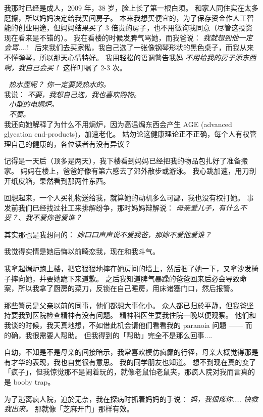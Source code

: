 \documentclass[12pt]{report}
\newcommand{\tab}{\hspace*{1cm}}
\newcommand{\speechCn}[1]{\textrm{\textit{\textcolor{Speech}{#1}}}}
\newcommand*\dashh{\,\,\textemdash\kern-1pt\textemdash\,\,}
\begin{document}
我那时已经是成人，2009 年，38 岁，脸上长了第一根白须。 和家人同住实在太多磨擦，所以妈妈决定给我买间房子。 本来我想买便宜的，为了保存资金作人工智能的创业用途，但妈妈结果买了 3 倍贵的房子，也不用徵询我同意（尽管这投资现在看来是不错的）。 我在看楼的时候发脾气骂她，而我爸说： \speechCn{我就想到他一定会骂....}! \  后来我们去买家俬，我自己选了一张像钢琴形状的黑色桌子，而我从来不懂弹琴，所以那天心情特好。 我用轻松的语调警告我妈 \speechCn{不用给我的房子添东西啊，我自己会买！}  这样叮嘱了 2-3 次。

\tab \dashh \speechCn{热水壶呢？ 你一定要煲热水的。}\\
\tab 我说： \speechCn{不要，我想自己选，我也喜欢购物。} \\
\tab \dashh \speechCn{小型的电焗炉。} \\
\tab \dashh \speechCn{不要。} \\
我还向她解释了为什么不用焗炉，因为高温焗东西会产生 AGE (advanced glycation end-products)，加速老化。 姑勿论这健康理论正不正确，每个人有权管理自己的健康的，各位读者有没有异议？

记得是一天后（顶多是两天），我下楼看到妈妈已经把我的物品包扎好了准备搬家。 妈妈在楼上，爸爸好像有第六感去了郊外散步或游泳。 我心跳加速，用刀剖开纸皮箱，果然看到那两件东西。

回想起来，一个人买礼物送给我，就算她的动机多么可鄙，我也没有权打她。 事发前我们已经找过社工来排解纷争，那时妈妈辩解说： \speechCn{母亲爱儿子，有什么不妥？}、\speechCn{我不爱你爸爱谁？}

其实那也是我想问的： \speechCn{妳口口声声说不爱我爸，那妳不爱他爱谁？}

我觉得实情是她后悔以前畸恋我，现在和我斗气。

我拿起焗炉跑上楼，把它狠狠地摔在她房间的墙上，然后掴了她一下，又拿沙发椅子摔向她，并要她跪下来道歉。 之后我知道脾气暴躁的爸爸回来后必会导致命案，所以我拿了厨房的菜刀，反锁在自己睡房，用床诸塞门口，然后报警。

那些警员是父亲以前的同事，他们都想大事化小。 众人都已归於平静，但我爸坚持要我到医院检查精神有没有问题。 精神科医生要我住院一晚以便观察。 他们和我谈的时候，我天真地想，不如借此机会请他们看看我的 paranoia 问题 —— 而的确，我很需要人帮助。 但我得到的「帮助」完全不是那么回事....

自幼，不知是不是母亲的间接暗示，我常喜欢模仿疯癫的行径，母亲大概觉得那是有才华的表现，我也自觉很有意思。 我的同学朋友也知道。 想不到现在真的变了「疯子」，但我惊觉那不是闹着玩的，就像老鼠怕老鼠夹，那疯人院对我而言真的是 booby trap。

为了逃离疯人院，迫於无奈，我在探病时抓着妈妈的手说： \speechCn{妈，我很疼你.... 快救我出来。}  那就像「芝麻开门」那样有效。
\end{document}

